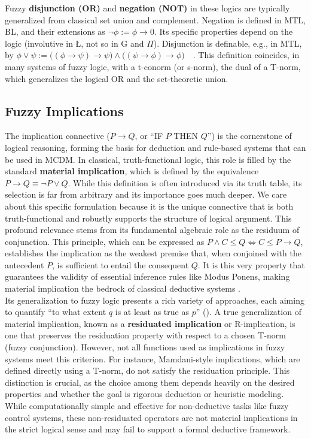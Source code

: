Fuzzy \textbf{disjunction (OR)} and \textbf{negation (NOT)} in these logics are typically generalized from classical set union and complement. Negation is defined in MTL, BL, and their extensions as $\lnot \phi := \phi \rightarrow 0$. Its specific properties depend on the logic (involutive in \L, not so in G and $\Pi$). Disjunction is definable, e.g., in MTL, by $\phi \vee \psi := \big((\phi \rightarrow \psi) \rightarrow \psi\big) \wedge \big((\psi \rightarrow \phi) \rightarrow \phi\big)$~\cite[Def. 1]{GodoMonoidal}~\cite[Def. 2.2.1]{Hajek1998}. This definition coincides, in many systems of fuzzy logic, with a t-conorm (or s-norm), the dual of a T-norm, which generalizes the logical OR and the set-theoretic union.

\subsection{Fuzzy Implications}

The implication connective ($P \rightarrow Q$, or ``IF $P$ THEN $Q$'') is the cornerstone of logical reasoning, forming the basis for deduction and rule-based systems that can be used in MCDM. In classical, truth-functional logic, this role is filled by the standard \textbf{material implication}, which is defined by the equivalence $P \rightarrow Q \equiv \neg P \lor Q$. While this definition is often introduced via its truth table, its selection is far from arbitrary and its importance goes much deeper. We care about this specific formulation because it is the unique connective that is both truth-functional and robustly supports the structure of logical argument. This profound relevance stems from its fundamental algebraic role as the residuum of conjunction. This principle, which can be expressed as $P \land C \le Q \iff C \le P \rightarrow Q$, establishes the implication as the weakest premise that, when conjoined with the antecedent $P$, is sufficient to entail the consequent $Q$. It is this very property that guarantees the validity of essential inference rules like Modus Ponens, making material implication the bedrock of classical deductive systems \cite{KORNELL_2023}.\\

Its generalization to fuzzy logic presents a rich variety of approaches, each aiming to quantify ``to what extent $q$ is at least as true as $p$'' (\cite[p.57]{FULLER2}). A true generalization of material implication, known as a \textbf{residuated implication} or R-implication, is one that preserves the residuation property with respect to a chosen T-norm (fuzzy conjunction). However, not all functions used as implications in fuzzy systems meet this criterion. For instance, Mamdani-style implications, which are defined directly using a T-norm, do not satisfy the residuation principle. This distinction is crucial, as the choice among them depends heavily on the desired properties and whether the goal is rigorous deduction or heuristic modeling. While computationally simple and effective for non-deductive tasks like fuzzy control systems, these non-residuated operators are not material implications in the strict logical sense and may fail to support a formal deductive framework.


